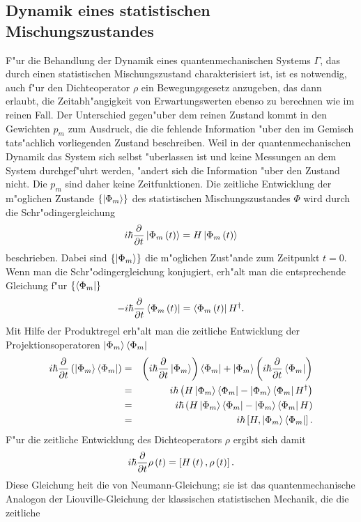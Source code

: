    \subsection{Dynamik eines statistischen Mischungszustandes}
    F"ur die Behandlung der Dynamik eines quantenmechanischen Systems $\Gamma$, das durch einen statistischen Mischungszustand charakterisiert ist, ist es 
    notwendig, auch f"ur den Dichteoperator $\rho$ ein Bewegungsgesetz anzugeben, das dann erlaubt, die Zeitabh"angigkeit von Erwartungswerten ebenso zu 
    berechnen wie im reinen Fall. Der Unterschied gegen"uber dem reinen Zustand kommt in den Gewichten $p_m$ zum Ausdruck, die die fehlende Information "uber
    den im Gemisch tats"achlich vorliegenden Zustand  beschreiben. Weil in der quantenmechanischen Dynamik das System sich selbst "uberlassen ist und keine 
    Messungen an dem System durchgef"uhrt werden, "andert sich die Information "uber den Zustand nicht. Die $p_m$ sind daher keine Zeitfunktionen.
    Die zeitliche Entwicklung der m"oglichen Zustande $\left\{ \left| \Phi_m \right> \right\}$ des statistischen Mischungszustandes $\Phi$ wird durch die Schr"odingergleichung  
    $$ i\hbar {\partial \over \partial t} \left| \Phi_m\left( t\right) \right> = H\left| \Phi_m\left( t\right) \right> $$
    beschrieben. Dabei sind $\left\{ \left| \Phi_m \right> \right\}$ die m"oglichen Zust"ande zum Zeitpunkt $t=0$. Wenn man die Schr"odingergleichung konjugiert, erh"alt man die 
    entsprechende Gleichung f"ur $\left\{ \left< \Phi_m \right| \right\}$ 
    $$ -i\hbar {\partial \over \partial t} \left< \Phi_m\left( t\right) \right| = \left< \Phi_m\left( t\right) \right|H^{\dag}. $$
    Mit Hilfe der Produktregel erh"alt man die zeitliche Entwicklung der Projektionsoperatoren $\left| \Phi_m \right>\left< \Phi_m \right|$
    \begin{eqnarray*}
      i\hbar {\partial \over \partial t}\left( \left| \Phi_m \right>\left< \Phi_m \right| \right)  & = & \left( i\hbar {\partial \over \partial t}\left| \Phi_m \right> \right)\left< \Phi_m \right| + \left| \Phi_m \right> \left( i\hbar {\partial \over \partial t}\left< \Phi_m \right|\right) \\
                                                 & = & i\hbar\left( H\left| \Phi_m \right>\left< \Phi_m \right| - \left| \Phi_m \right>\left< \Phi_m \right|H^{\dag}\right) \\
                                                 & = & i\hbar\left( H\left| \Phi_m \right>\left< \Phi_m \right| - \left| \Phi_m \right>\left< \Phi_m \right|H\right) \\
                                                 & = & i\hbar\left[ H , \left| \Phi_m \right>\left< \Phi_m \right| \right].
    \end{eqnarray*}
    F"ur die zeitliche Entwicklung des Dichteoperators $\rho$ ergibt sich damit
    $$ i\hbar{\partial \over \partial t} \rho\left( t\right) = \left[ H\left( t\right) , \rho\left( t\right) \right]. $$
    Diese Gleichung hei\3t die von Neumann-Gleichung; sie ist das quantenmechanische Analogon der Liouville-Gleichung der klassischen statistischen Mechanik, die die zeitliche 
